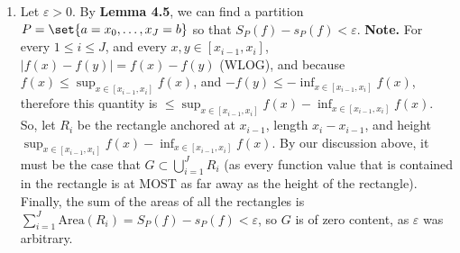 \documentclass[12pt]{article}
\theoremstyle{definition}
\theoremstyle{remark}
\newcommand{\ve}{\varepsilon}
\begin{document}
\begin{enumerate}[leftmargin=\labelsep]
		\item 
		Let $\ve > 0$. By \textbf{Lemma 4.5}, we can find a partition $P = \set{a=x_0, \ldots, x_J = b}$ so that $S_P(f) - s_P(f) < \ve$. \textbf{Note.} For every $1 \leq i \leq J$, and every $x, y \in [x_{i-1}, x_i]$, $|f(x) - f(y)| = f(x) - f(y)$ (WLOG), and because $f(x) \leq \sup_{x \in [x_{i-1}, x_i]} f(x)$, and $-f(y) \leq -\inf_{x \in [x_{i-1}, x_i]} f(x)$, therefore this quantity is $\leq \sup_{x \in [x_{i-1}, x_i]} f(x) - \inf_{x \in [x_{i-1}, x_i]} f(x)$. So, let $R_i$ be the rectangle anchored at $x_{i-1}$, length $x_i-x_{i-1}$, and height $\sup_{x \in [x_{i-1}, x_i]} f(x) - \inf_{x \in [x_{i-1}, x_i]} f(x)$. By our discussion above, it must be the case that $G \subset \bigcup_{i=1}^{J} R_i$ (as every function value that is contained in the rectangle is at MOST as far away as the height of the rectangle). Finally, the sum of the areas of all the rectangles is $\sum_{i=1}^{J} \mathrm{Area}(R_i) = S_P(f) - s_P(f) < \ve$, so $G$ is of zero content, as $\ve$ was arbitrary.
		

\end{enumerate}
\end{document}
